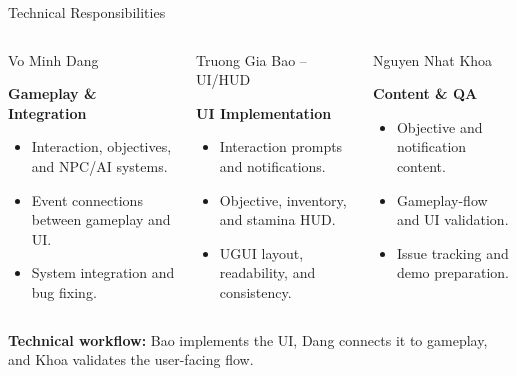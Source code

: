 \documentclass[aspectratio=169,10pt]{beamer}
\begin{document}
\begin{frame}{Technical Responsibilities}
  \begin{columns}[T,onlytextwidth]
    \begin{block}{Vo Minh Dang}
      \begin{minipage}[t][.35\textheight][t]{\linewidth}
        \small
        \textbf{Gameplay \& Integration}
        \begin{itemize}
          \item Interaction, objectives, and NPC/AI systems.
          \item Event connections between gameplay and UI.
          \item System integration and bug fixing.
        \end{itemize}
      \end{minipage}
    \end{block}

    \begin{alertblock}{Truong Gia Bao -- UI/HUD}
      \begin{minipage}[t][.35\textheight][t]{\linewidth}
        \small
        \textbf{UI Implementation}
        \begin{itemize}
          \item Interaction prompts and notifications.
          \item Objective, inventory, and stamina HUD.
          \item UGUI layout, readability, and consistency.
        \end{itemize}
      \end{minipage}
    \end{alertblock}

    \begin{block}{Nguyen Nhat Khoa}
      \begin{minipage}[t][.35\textheight][t]{\linewidth}
        \small
        \textbf{Content \& QA}
        \begin{itemize}
          \item Objective and notification content.
          \item Gameplay-flow and UI validation.
          \item Issue tracking and demo preparation.
        \end{itemize}
      \end{minipage}
    \end{block}
  \end{columns}

  \vspace{0.15cm}
  \small\centering
  \textbf{Technical workflow:} Bao implements the UI, Dang connects it to gameplay, and Khoa validates the user-facing flow.
\end{frame}
\end{document}
